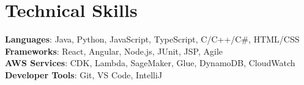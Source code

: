 \documentclass[letterpaper,11pt]{article}
\begin{document}
%
\section{Technical Skills}
 \begin{itemize}[leftmargin=0.15in, label={}]
    \small{\item{
     \textbf{Languages}{: Java, Python, JavaScript, TypeScript, C/C++/C\#, HTML/CSS} \\
     \textbf{Frameworks}{: React, Angular, Node.js, JUnit, JSP, Agile} \\
     \textbf{AWS Services}{: CDK, Lambda, SageMaker, Glue, DynamoDB, CloudWatch} \\
     \textbf{Developer Tools}{: Git, VS Code, IntelliJ} \\
    }}
 \end{itemize}


\end{document}
